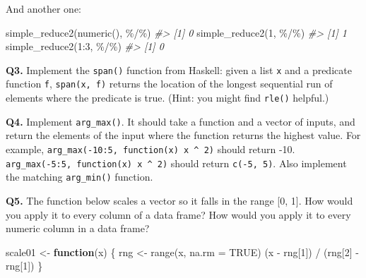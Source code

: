 \documentclass[
]{book}
\newenvironment{Shaded}{\begin{snugshade}}{\end{snugshade}}
\newcommand{\AttributeTok}[1]{\textcolor[rgb]{0.77,0.63,0.00}{#1}}
\newcommand{\CommentTok}[1]{\textcolor[rgb]{0.56,0.35,0.01}{\textit{#1}}}
\newcommand{\ConstantTok}[1]{\textcolor[rgb]{0.00,0.00,0.00}{#1}}
\newcommand{\ControlFlowTok}[1]{\textcolor[rgb]{0.13,0.29,0.53}{\textbf{#1}}}
\newcommand{\DecValTok}[1]{\textcolor[rgb]{0.00,0.00,0.81}{#1}}
\newcommand{\FunctionTok}[1]{\textcolor[rgb]{0.00,0.00,0.00}{#1}}
\newcommand{\NormalTok}[1]{#1}
\newcommand{\OtherTok}[1]{\textcolor[rgb]{0.56,0.35,0.01}{#1}}
\newcommand{\SpecialCharTok}[1]{\textcolor[rgb]{0.00,0.00,0.00}{#1}}
\newcommand{\StringTok}[1]{\textcolor[rgb]{0.31,0.60,0.02}{#1}}
\begin{document}
And another one:

\begin{Shaded}
\begin{Highlighting}[]
\FunctionTok{simple\_reduce2}\NormalTok{(}\FunctionTok{numeric}\NormalTok{(), }\StringTok{\textasciigrave{}}\AttributeTok{\%/\%}\StringTok{\textasciigrave{}}\NormalTok{)}
\CommentTok{\#\textgreater{} [1] 0}
\FunctionTok{simple\_reduce2}\NormalTok{(}\DecValTok{1}\NormalTok{, }\StringTok{\textasciigrave{}}\AttributeTok{\%/\%}\StringTok{\textasciigrave{}}\NormalTok{)}
\CommentTok{\#\textgreater{} [1] 1}
\FunctionTok{simple\_reduce2}\NormalTok{(}\DecValTok{1}\SpecialCharTok{:}\DecValTok{3}\NormalTok{, }\StringTok{\textasciigrave{}}\AttributeTok{\%/\%}\StringTok{\textasciigrave{}}\NormalTok{)}
\CommentTok{\#\textgreater{} [1] 0}
\end{Highlighting}
\end{Shaded}

\textbf{Q3.} Implement the \texttt{span()} function from Haskell: given a list \texttt{x} and a predicate function \texttt{f}, \texttt{span(x,\ f)} returns the location of the longest sequential run of elements where the predicate is true. (Hint: you might find \texttt{rle()} helpful.)

\textbf{Q4.} Implement \texttt{arg\_max()}. It should take a function and a vector of inputs, and return the elements of the input where the function returns the highest value. For example, \texttt{arg\_max(-10:5,\ function(x)\ x\ \^{}\ 2)} should return -10. \texttt{arg\_max(-5:5,\ function(x)\ x\ \^{}\ 2)} should return \texttt{c(-5,\ 5)}. Also implement the matching \texttt{arg\_min()} function.

\textbf{Q5.} The function below scales a vector so it falls in the range {[}0, 1{]}. How would you apply it to every column of a data frame? How would you apply it to every numeric column in a data frame?

\begin{Shaded}
\begin{Highlighting}[]
\NormalTok{scale01 }\OtherTok{\textless{}{-}} \ControlFlowTok{function}\NormalTok{(x) \{}
\NormalTok{  rng }\OtherTok{\textless{}{-}} \FunctionTok{range}\NormalTok{(x, }\AttributeTok{na.rm =} \ConstantTok{TRUE}\NormalTok{)}
\NormalTok{  (x }\SpecialCharTok{{-}}\NormalTok{ rng[}\DecValTok{1}\NormalTok{]) }\SpecialCharTok{/}\NormalTok{ (rng[}\DecValTok{2}\NormalTok{] }\SpecialCharTok{{-}}\NormalTok{ rng[}\DecValTok{1}\NormalTok{])}
\NormalTok{\}}
\end{Highlighting}
\end{Shaded}
\end{document}
